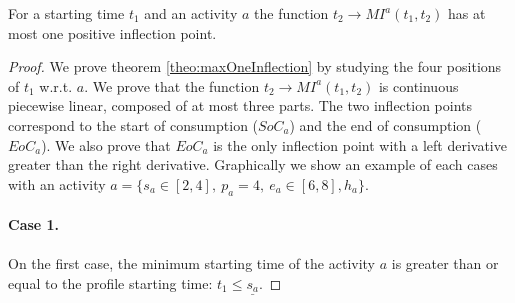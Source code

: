 \documentclass{llncs}
\newcommand \MI[3]{MI^{#3}(#1,#2) }
\newcommand \SOI[1]{SoC_{#1} }
\newcommand \DOI[1]{EoC_{#1}}
\begin{document}
\begin{theorem}\label{theo:maxOneInflection}
For a starting time $t_1$ and an activity $a$ the function  $t_2 \rightarrow \MI{t_1}{t_2}{a}$ has at most one positive inflection point.\end{theorem}
{\small
\begin{proof}
We  prove theorem \ref{theo:maxOneInflection} by studying the four positions of $t_1$ w.r.t. $a$.
We prove that the function $t_2 \rightarrow \MI{t_1}{t_2}{a}$ is continuous piecewise linear, composed of at most three parts.
The two inflection points correspond to the start of consumption ($\SOI{a}$) 
and the end of consumption ($\DOI{a}$). We also prove that $\DOI{a}$ is the only inflection point with a left derivative greater than the right derivative.
Graphically we show an example of each cases with an activity $a = \{ s_a \!\in\! [2,4],~ p_a\!=\!4,~e_a\!\in\![6,8],h_a\}$.

\paragraph{Case 1.}
\paragraph{}
\hspace{-0.15cm}\begin{minipage}{0.45\textwidth} 
On the first case, the minimum starting time of the activity $a$ is greater than or equal to the profile starting time: 
$t_1 \le \underline{s_a} $.
\end{minipage}
\begin{minipage}{0.45\textwidth} 
   \hspace{0.5cm}
\end{minipage}
\end{proof}}
\end{document}
